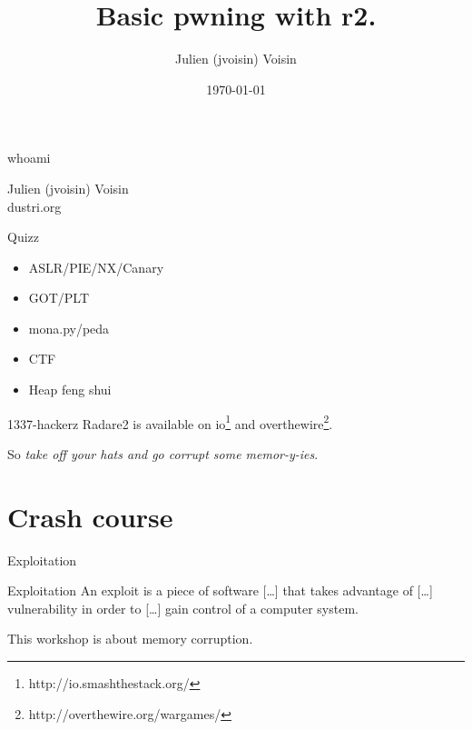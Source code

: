 \documentclass{beamer}
\title{Basic pwning with r2.}
\date{\today}
\author[jvoisin]{Julien (jvoisin) Voisin}
\institute{r2con}
\begin{document}
\maketitle

\begin{frame}{whoami}
    \begin{center}
        \Large Julien (jvoisin) Voisin\\dustri.org
    \end{center}
\end{frame}

\begin{frame}{Quizz}
    \begin{itemize}[<+->]
        \item ASLR/PIE/NX/Canary
        \item GOT/PLT
        \item mona.py/peda
        \item CTF
        \item Heap feng shui
    \end{itemize}
\end{frame}

\begin{frame}{1337-hackerz}
	Radare2 is available on \alert{io}\footnote{http://io.smashthestack.org/}
	and \alert{overthewire}\footnote{http://overthewire.org/wargames/}.

	\begin{center}
		\pause So \emph{take off your hats and go corrupt some memor-y-ies}.
	\end{center}
\end{frame}


\section{Crash course}
\begin{frame}{Exploitation}
	\begin{block}{Exploitation}
		An exploit is a piece of software [\dots] that takes advantage of [\dots] vulnerability in order to [\dots] gain control of a computer system.
	\end{block}
	\begin{center}
		This workshop is about memory corruption.
	\end{center}
\end{frame}
\end{document}
